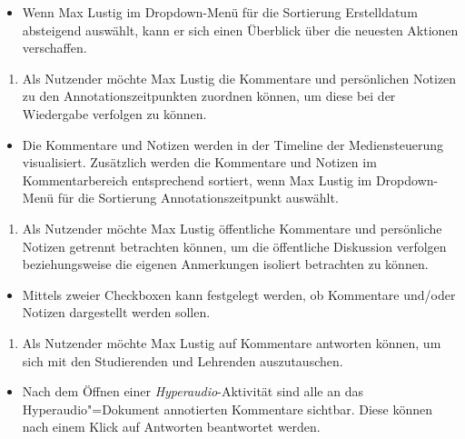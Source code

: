 \begin{itemize}[resume*]
\item[\Checkmark]
Wenn Max Lustig im Dropdown-Menü für die Sortierung \glqq Erstelldatum absteigend\grqq{} auswählt, kann er sich einen Überblick über die neuesten Aktionen verschaffen.
\end{itemize}
\vspace{0.25cm}
\begin{enumerate}[resume*]
\item \label{US-Sortierung-Zeitpunkt-Eval} Als Nutzender möchte Max Lustig die Kommentare und persönlichen Notizen zu den Annotationszeitpunkten zuordnen können, um diese bei der Wiedergabe verfolgen zu können.
\end{enumerate}
\begin{itemize}[resume*]
\item[\Checkmark]
Die Kommentare und Notizen werden in der Timeline der Mediensteuerung visualisiert. Zusätzlich werden die Kommentare und Notizen im Kommentarbereich entsprechend sortiert, wenn Max Lustig im Dropdown-Menü für die Sortierung \glqq Annotationszeitpunkt\grqq{} auswählt.
\end{itemize}
\vspace{0.25cm}
\begin{enumerate}[resume*]
\item \label{US-Filter-Eval} Als Nutzender möchte Max Lustig öffentliche Kommentare und persönliche Notizen getrennt betrachten können, um die öffentliche Diskussion verfolgen beziehungsweise die eigenen Anmerkungen isoliert betrachten zu können.
\end{enumerate}
\begin{itemize}[resume*]
\item[\Checkmark]
Mittels zweier Checkboxen kann festgelegt werden, ob Kommentare und/oder Notizen dargestellt werden sollen.
\end{itemize}
\vspace{0.25cm}
\begin{enumerate}[resume*]
\item \label{US-Antwort-S-Eval} Als Nutzender möchte Max Lustig auf Kommentare antworten können, um sich mit den Studierenden und Lehrenden auszutauschen.
\end{enumerate}
\begin{itemize}[resume*]
\item[\Checkmark]
Nach dem Öffnen einer \textit{Hyperaudio}-Aktivität sind alle an das Hyperaudio"=Dokument annotierten Kommentare sichtbar. Diese können nach einem Klick auf \glqq Antworten\grqq{} beantwortet werden.
\end{itemize}
